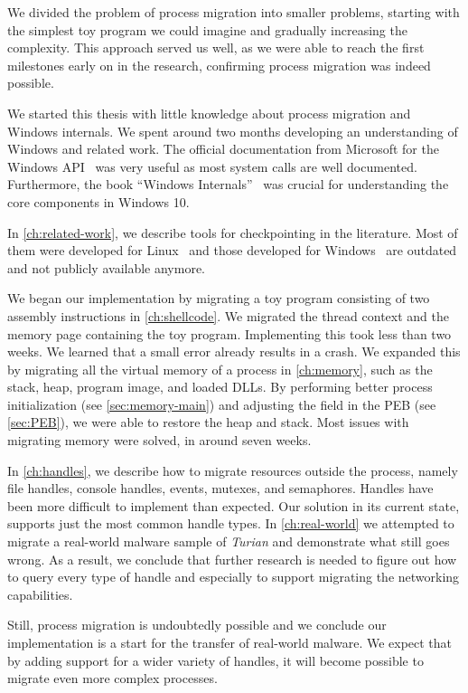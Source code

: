 \documentclass[a4paper, 11pt, english]{report}
\begin{document}
We divided the problem of process migration into smaller problems, starting with the simplest toy program we could imagine and gradually increasing the complexity. This approach served us well, as we were able to reach the first milestones early on in the research, confirming process migration was indeed possible.

We started this thesis with little knowledge about process migration and Windows internals. We spent around two months developing an understanding of Windows and related work. The official documentation from Microsoft for the Windows API~\cite{win32-api} was very useful as most system calls are well documented. Furthermore, the book ``Windows Internals''~\cite{windows-internals}\cite{windows-internals-2} was crucial for understanding the core components in Windows 10.

In \autoref{ch:related-work}, we describe tools for checkpointing in the literature. Most of them were developed for Linux~\cite{ansel2009dmtcp}\cite{paul2006BLCR}\cite{criu} and those developed for Windows~\cite{chung1999winckp} are outdated and not publicly available anymore.

We began our implementation by migrating a toy program consisting of two assembly instructions in \autoref{ch:shellcode}. We migrated the thread context and the memory page containing the toy program. Implementing this took less than two weeks. We learned that a small error already results in a crash.
We expanded this by migrating all the virtual memory of a process in \autoref{ch:memory}, such as the stack, heap, program image, and loaded DLLs. By performing better process initialization (see \autoref{sec:memory-main}) and adjusting the field in the PEB (see \autoref{sec:PEB}), we were able to restore the heap and stack. Most issues with migrating memory were solved, in around seven weeks. 

In \autoref{ch:handles}, we describe how to migrate resources outside the process, namely file handles, console handles, events, mutexes, and semaphores.
Handles have been more difficult to implement than expected. Our solution in its current state, supports just the most common handle types.
In \autoref{ch:real-world} we attempted to migrate a real-world malware sample of \textit{Turian} and demonstrate what still goes wrong.
As a result, we conclude that further research is needed to figure out how to query every type of handle and especially to support migrating the networking capabilities. 

Still, process migration is undoubtedly possible and we conclude our implementation is a start for the transfer of real-world malware.
We expect that by adding support for a wider variety of handles, it will become possible to migrate even more complex processes.
\end{document}
